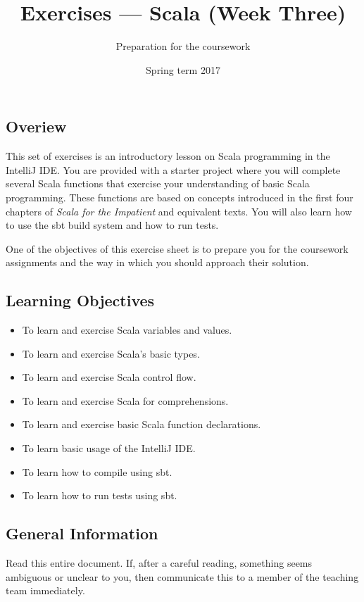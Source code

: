 \documentclass[12pt,a4paper]{exam}
\title{Exercises --- Scala (Week Three)}
\author{Preparation for the coursework}
\date{Spring term 2017}
\begin{document}
\maketitle

\subsection*{Overiew}

\noindent This set of exercises is an introductory lesson on Scala programming in the IntelliJ IDE. 
You are provided with a starter project where you will complete several Scala functions that exercise 
your understanding of basic Scala programming. These functions are based on concepts introduced in the 
first four chapters of \emph{Scala for the Impatient} and equivalent texts. 
You will also learn how to use the sbt build system and how to run tests.

One of the objectives of this exercise sheet is to prepare you for the coursework assignments and the way
in which you should approach their solution.

\subsection*{Learning Objectives}

\begin{itemize}
	\item To learn and exercise Scala variables and values.
	\item To learn and exercise Scala’s basic types.
	\item To learn and exercise Scala control flow.
	\item To learn and exercise Scala for comprehensions.
	\item To learn and exercise basic Scala function declarations.
	\item To learn basic usage of the IntelliJ IDE.
	\item To learn how to compile using sbt.
	\item To learn how to run tests using sbt.
\end{itemize}

\subsection*{General Information}

Read this entire document. If, after a careful reading, something seems ambiguous or unclear to you, 
then communicate this to a member of the teaching team immediately.
\end{document}
